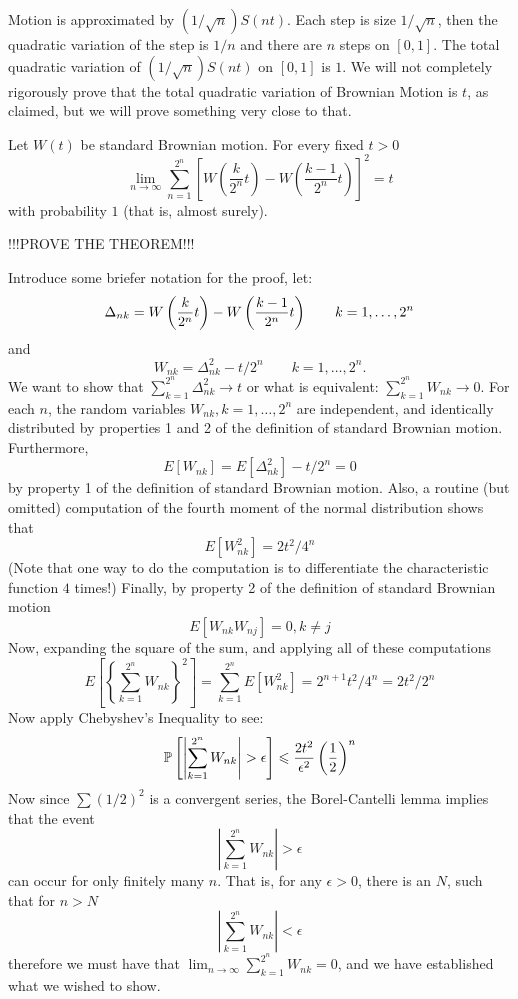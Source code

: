 \begin{problem}
  Motion is approximated by $(1/\sqrt{n}) S(nt)$.  Each step is size $1/\sqrt{n}$,
  then the quadratic variation of the step is $1/n$ and there are $n$ steps on $[0,1]$.
  The total quadratic variation of $(1/\sqrt{n})S(nt)$ on $[0,1]$ is $1$.
  We will not completely rigorously prove that the total quadratic variation of
  Brownian Motion is $t$, as claimed, but we will prove something very
  close to that.
  \begin{theorem}
  Let $W(t)$ be standard Brownian motion.  For every fixed $t > 0$
  \[
    \lim_{n \to \infty}
             \sum_{n=1}^{2^n}
               \left[
                  W\left( \frac{k}{2^n} t \right) -
                  W\left( \frac{k-1}{2^n} t \right)
               \right]^2
           = t
  \]
  \ni with probability $1$ (that is, almost surely).
  \end{theorem}
  !!!PROVE THE THEOREM!!!


\begin{sol}
  Introduce some briefer notation for the proof, let:
  \[
    \Dt_{nk} =
                  W\left( \frac{k}{2^n} t \right) -
                  W\left( \frac{k-1}{2^n} t \right)
          \qquad k = 1, \ldots, 2^n
  \]
  and
  \[
    W_{nk} = \Delta^{2}_{nk} - t/2^n \qquad k = 1, \ldots, 2^n.
  \]
  We want to show that $\sum_{k=1}^{2^n} \Delta^2_{nk} \to t$ or what
  is equivalent: $\sum_{k=1}^{2^n} W_{nk} \to 0$.  For each $n$, the
  random variables $W_{nk}, k = 1, \ldots, 2^n$ are independent, and
  identically distributed by properties 1 and 2 of the definition of
  standard Brownian motion.  Furthermore,
  \[
    E[ W_{nk} ] = E[ \Delta_{nk}^2 ] - t/2^n = 0
  \]
  by property 1 of the definition of standard Brownian motion.  Also, a
 routine (but omitted)
  computation of the fourth moment of the normal distribution
  shows that
  \[
    E[W^2_{nk} ] = 2t^2/4^n
  \]
  (Note that one way to do the computation is to differentiate the
  characteristic function $4$ times!)
  Finally, by property 2 of the definition of standard Brownian motion
  \[
    E[ W_{nk}W_{nj} ] = 0, k \ne j
  \]
  Now, expanding the square of the sum, and applying all of these
  computations
  $$
    E\left[ \left\{ \sum_{k=1}^{2^n} W_{nk} \right\}^2 \right] =
    \sum_{k=1}^{2^n} E[W^2_{nk}] = 2^{n+1}t^2/4^n = 2t^2/2^n
  $$
  Now apply Chebyshev's Inequality to see:
  $$
    \P\left[ \left| \sum_{k=1}^{2^n} W_{nk} \right| > \epsilon \right]
     \le \frac{2 t^2}{\epsilon^2} \left( \frac{1}{2}
    \right)^n
  $$
  Now since $\sum (1/2)^2$ is a convergent series, the Borel-Cantelli
  lemma implies that the event
  $$
    \left| \sum_{k=1}^{2^n} W_{nk} \right| > \epsilon
  $$
  can occur for only finitely many $n$.  That is, for any $\epsilon >
  0$, there is an $N$, such that for $n > N$
  $$
    \left| \sum_{k=1}^{2^n} W_{nk} \right| < \epsilon
  $$
  therefore we must have that
  $\lim_{n \to \infty} \sum_{k=1}^{2^n} W_{nk} = 0$,
  and we have established what we
  wished to show.
\end{sol}
\end{problem}

